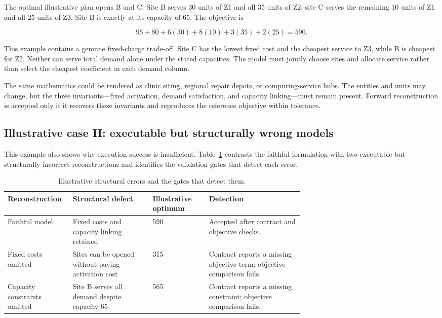 The optimal illustrative plan opens B and C.  Site B serves 30 units of Z1 and
all 35 units of Z2; site C serves the remaining 10 units of Z1 and all 25 units
of Z3.  Site B is exactly at its capacity of 65.  The objective is

\begin{equation}
  95+80+6(30)+8(10)+3(35)+2(25)=590.
  \label{eq:example-recalculation}
\end{equation}

This example contains a genuine fixed-charge trade-off.  Site C has the lowest
fixed cost and the cheapest service to Z3, while B is cheapest for Z2.  Neither
can serve total demand alone under the stated capacities.  The model must jointly
choose sites and allocate service rather than select the cheapest coefficient in
each demand column.

The same mathematics could be rendered as clinic siting, regional repair depots,
or computing-service hubs.  The entities and units may change, but the three
invariants---fixed activation, demand satisfaction, and capacity linking---must
remain present.  Forward reconstruction is accepted only if it recovers these
invariants and reproduces the reference objective within tolerance.

\subsection{Illustrative case II: executable but structurally wrong models}
\label{app:orcpt-case-failure}

This example also shows why execution success is insufficient.
Table~\ref{tab:orcpt-example-errors} contrasts the faithful formulation with
two executable but structurally incorrect reconstructions and identifies the
validation gates that detect each error.

\begin{table}[H]
  \centering
  \caption{Illustrative structural errors and the gates that detect them.}
  \label{tab:orcpt-example-errors}
  \small
  \begin{tabularx}{\linewidth}{@{}p{0.22\linewidth}p{0.27\linewidth}p{0.19\linewidth}X@{}}
    \toprule
    Reconstruction & Structural defect & Illustrative optimum & Detection \\
    \midrule
    Faithful model
      & Fixed costs and capacity linking retained
      & 590
      & Accepted after contract and objective checks. \\
    Fixed costs omitted
      & Sites can be opened without paying activation cost
      & 315
      & Contract reports a missing objective term; objective comparison fails. \\
    Capacity constraints omitted
      & Site B serves all demand despite capacity 65
      & 565
      & Contract reports a missing constraint; objective comparison fails. \\
    \bottomrule
  \end{tabularx}
\end{table}

